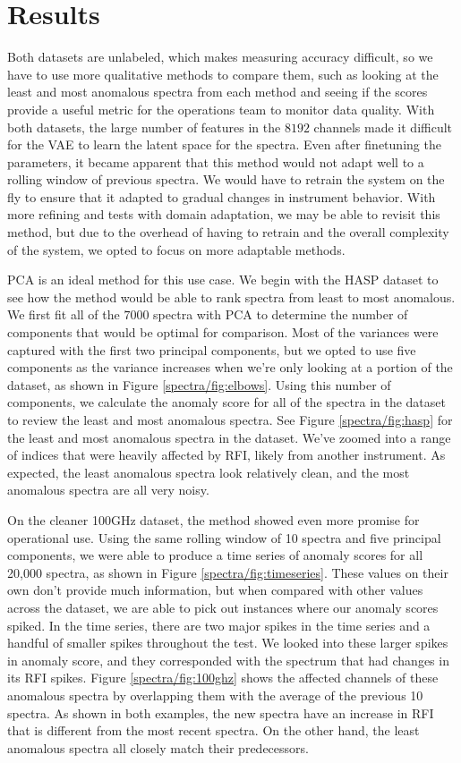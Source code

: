 \section{Results}
\label{spectra/sec:results}
Both datasets are unlabeled, which makes measuring accuracy difficult, so we have to use more qualitative methods to compare them, such as looking at the least and most anomalous spectra from each method and seeing if the scores provide a useful metric for the operations team to monitor data quality.
With both datasets, the large number of features in the $8192$ channels made it difficult for the VAE to learn the latent space for the spectra. 
Even after finetuning the parameters, it became apparent that this method would not adapt well to a rolling window of previous spectra.
We would have to retrain the system on the fly to ensure that it adapted to gradual changes in instrument behavior.
With more refining and tests with domain adaptation, we may be able to revisit this method, but due to the overhead of having to retrain and the overall complexity of the system, we opted to focus on more adaptable methods.



PCA is an ideal method for this use case. 
We begin with the HASP dataset to see how the method would be able to rank spectra from least to most anomalous.
We first fit all of the $7000$ spectra with PCA to determine the number of components that would be optimal for comparison.
Most of the variances were captured with the first two principal components, but we opted to use five components as the variance increases when we're only looking at a portion of the dataset, as shown in Figure \ref{spectra/fig:elbows}.
Using this number of components, we calculate the anomaly score for all of the spectra in the dataset to review the least and most anomalous spectra. 
See Figure \ref{spectra/fig:hasp} for the least and most anomalous spectra in the dataset. 
We've zoomed into a range of indices that were heavily affected by RFI, likely from another instrument. 
As expected, the least anomalous spectra look relatively clean, and the most anomalous spectra are all very noisy.

On the cleaner 100GHz dataset, the method showed even more promise for operational use.
Using the same rolling window of 10 spectra and five principal components, we were able to produce a time series of anomaly scores for all 20,000 spectra, as shown in Figure \ref{spectra/fig:timeseries}.
These values on their own don't provide much information, but when compared with other values across the dataset, we are able to pick out instances where our anomaly scores spiked. 
In the time series, there are two major spikes in the time series and a handful of smaller spikes throughout the test. 
We looked into these larger spikes in anomaly score, and they corresponded with the spectrum that had changes in its RFI spikes.
Figure \ref{spectra/fig:100ghz} shows the affected channels of these anomalous spectra by overlapping them with the average of the previous 10 spectra. 
As shown in both examples, the new spectra have an increase in RFI that is different from the most recent spectra. 
On the other hand, the least anomalous spectra all closely match their predecessors.

